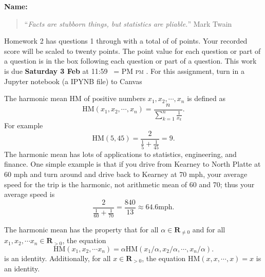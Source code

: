 \documentclass[12pt,fleqn]{exam}
\makeatletter
\newcommand{\reals}{\mathbf{R}}
\newcommand{\HM}{\mathrm{HM}}
\newcommand{\quiz}{2}
\newcommand{\term}{Spring}
\DeclareRobustCommand{\maybefakesc}[1]{%
  \ifnum\pdfstrcmp{\f@series}{\bfdefault}=\z@
    {\fontsize{\dimexpr0.8\dimexpr\f@size pt\relax}{0}\selectfont\uppercase{#1}}%
  \else
    \textsc{#1}%
  \fi
}
\newcommand\PM{\,\maybefakesc{pm}\xspace}
\makeatother
\begin{document}
\large
\vspace{0.1in}
\noindent{}
{\bf Name:}  \\
\noindent \makebox[3.0truein][l]{\textbf{Homework \quiz, \term \/ \the\year}}
\vspace{0.1in}

\begin{quote}
“\emph{Facts are stubborn things, but statistics are pliable.}”  \hfill {\sc Mark Twain} 

\end{quote}
\noindent  Homework \quiz\/  has questions 1 through  \numquestions \/ with a total of of  \numpoints\/  points. 
Your recorded score will be scaled to twenty points. The point
value for each question or part of a question is in the box following each question or part of a question.
This work is due \textbf{Saturday 3 Feb  } at 11:59 \PM. For this assignment, turn in a Jupyter notebook (a IPYNB file) to Canvas


\vspace{0.1in}
The harmonic mean $\HM$ of positive numbers $x_1, x_2, \cdots, x_n$ is defined as
\begin{equation*}
  \HM(x_1, x_2, \cdots, x_n) = \frac{n}{\sum_{k=1}^n \frac{1}{x_k}}.
\end{equation*}
For example
\begin{equation*}
  \HM(5,45) = \frac{2}{\frac{1}{5} + \frac{1}{45}} = 9.
\end{equation*}
The harmonic mean has lots of applications to statistics, engineering, and finance.   One simple example is that if
you drive from Kearney to North Platte at 60 mph and turn around and drive back to Kearney at 70 mph, your average speed for the trip is the harmonic, not arithmetic mean of 60 and 70; thus your average speed is 
\begin{equation*}
\frac{2}{\frac{1}{60} + \frac{1}{70}} = \frac{840}{13} \approx 64.6 \mathrm{mph}.
\end{equation*}

The harmonic mean has the property that for all $\alpha \in \reals_{\neq 0}$ and for all $x_1, x_2, \cdots x_n \in \reals_{> 0}$,
the equation
\begin{equation*}
  \HM(x_1, x_2, \cdots x_n) =\alpha  \HM(x_1 / \alpha , x_2 /\alpha , \cdots, x_n/\alpha ).
\end{equation*}
is an identity. Additionally, for all $x \in \reals_{>0}$, the equation
$  \HM(x,x, \cdots ,x ) =x$ is an identity.
\end{document}
